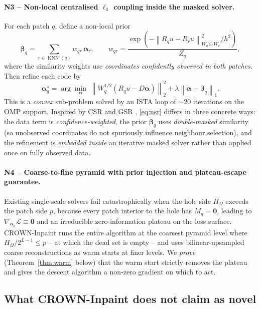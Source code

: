 \documentclass[11pt,a4paper]{article}
\theoremstyle{definition}
\theoremstyle{remark}
\newcommand{\Loss}{\mathcal{L}}
\newcommand{\norm}[1]{\left\lVert #1 \right\rVert}
\newcommand{\KNN}{\operatorname{KNN}}
\newcommand{\alphavec}{\bm{\alpha}}
\begin{document}
\paragraph{N3 -- Non-local centralised $\bm{\ell_1}$ coupling inside
the masked solver.}
For each patch $q$, define a non-local prior
\begin{equation}
\bm{\beta}_q = \sum_{r\in\KNN(q)} w_{qr}\,\alphavec_r,\qquad
w_{qr}=\frac{\exp(-\norm{R_q u-R_r u}_{W_q\odot W_r}^2/h^2)}{Z_q},
\end{equation}
where the similarity weights use \emph{coordinates confidently
observed in both patches}. Then refine each code by
\begin{equation}
\alphavec_q^\star
= \arg\min_{\alphavec}\;\norm{W_q^{1/2}(R_q u - D\alphavec)}_2^2
+ \lambda\norm{\alphavec - \bm{\beta}_q}_1.
\label{eq:nsr}
\end{equation}
This is a \emph{convex} sub-problem solved by an ISTA loop of $\sim 20$
iterations on the OMP support. Inspired by CSR
\cite{dong2011centralized} and GSR \cite{zhang2014groupbased},
\eqref{eq:nsr} differs in three concrete ways: the data term is
\emph{confidence-weighted}, the prior $\bm{\beta}_q$ uses
\emph{double-masked} similarity (so unobserved coordinates do not
spuriously influence neighbour selection), and the refinement is
\emph{embedded inside} an iterative masked solver rather than applied
once on fully observed data.

\paragraph{N4 -- Coarse-to-fine pyramid with prior injection and
plateau-escape guarantee.}
Existing single-scale solvers fail catastrophically when the hole side
$H_\Omega$ exceeds the patch side $p$, because every patch interior to
the hole has $M_q=\bm{0}$, leading to $\nabla_{\alphavec_q}\Loss\equiv\bm{0}$
and an irreducible zero-information plateau on the loss surface.
CROWN-Inpaint runs the entire algorithm at the coarsest pyramid level
where $H_\Omega/2^{L-1}\le p$ -- at which the dead set is empty -- and
uses bilinear-upsampled coarse reconstructions as warm starts at
finer levels. We \emph{prove} (Theorem~\ref{thm:warm} below) that the
warm start strictly removes the plateau and gives the descent
algorithm a non-zero gradient on which to act.

\subsection{What CROWN-Inpaint does not claim as novel}
\end{document}
